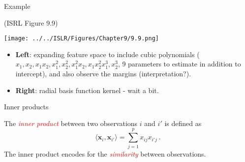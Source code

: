 \documentclass[10pt,ignorenonframetext,]{beamer}
\begin{document}
\begin{frame}

\begin{block}{Example}

(ISRL Figure 9.9)

\centering

\texttt{[image: ../../ISLR/Figures/Chapter9/9.9.png]}

\flushleft

\vspace{2mm}

\begin{itemize}
\item
  \textbf{Left}: expanding feature space to include cubic polynomials
  (\(x_1,x_2,x_1x_2,x_1^2,x_2^2,x_1^2x_2,x_1x_2^2x_1^3,x_2^3\), 9
  parameters to estimate in addition to intercept), and also observe the
  margins (interpretation?).
\item
  \textbf{Right}: radial basis function kernel - wait a bit.
\end{itemize}

\end{block}

\end{frame}

\begin{frame}

\begin{block}{Inner products}

\vspace{2mm}

The \emph{\textcolor{red}{inner product}} between two observations \(i\)
and \(i'\) is defined as \[
\langle {\boldsymbol x}_i , {\boldsymbol x}_{i'}\rangle =\sum_{j=1}^p x_{ij} x_{i' j} \ .
\] The inner product encodes for the \emph{\textcolor{red}{similarity}}
between observations.

\end{block}

\end{frame}
\end{document}
